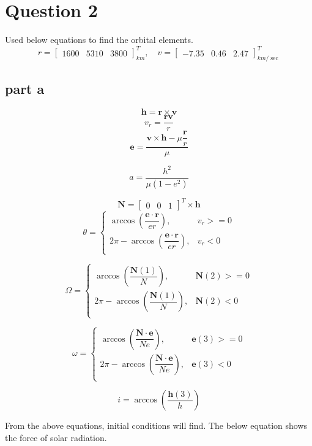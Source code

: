 \section{Question 2}
Used below equations to find the orbital elements.
$$
r = \begin{bmatrix}
    1600& 5310& 3800
\end{bmatrix}^{T}_{km}, \quad 
v = \begin{bmatrix}
    -7.35 & 0.46 & 2.47
\end{bmatrix}^{T}_{km/\sec}
$$
\subsection{part a}
$$
\boldsymbol h = \boldsymbol r \times \boldsymbol v 
$$
$$
v_r = \dfrac{\boldsymbol r \boldsymbol v}{r}
$$
$$
\boldsymbol e = \dfrac{\boldsymbol v \times \boldsymbol h -\mu \dfrac{\boldsymbol r}{r}}{\mu}
$$

$$
a = \dfrac{h^2}{\mu (1-e^2)}
$$

$$
\boldsymbol N = 
\begin{bmatrix}
    0 & 0 & 1
\end{bmatrix}^T \times \boldsymbol h
$$
$$
\theta = 
\begin{cases}
    \arccos\left(\dfrac{\boldsymbol e \cdot \boldsymbol r}{er}\right),& v_r >= 0\\
    2\pi-\arccos\left(\dfrac{\boldsymbol e \cdot \boldsymbol r}{er}\right),& v_r <  0\\
\end{cases}
$$

$$
\Omega = 
\begin{cases}
    \arccos\left(\dfrac{\boldsymbol N(1)}{N}\right),& \boldsymbol N(2) >= 0\\
    2\pi-\arccos\left(\dfrac{\boldsymbol N(1)}{N}\right) ,& \boldsymbol N(2) <0\\
\end{cases}
$$

$$
\omega = 
\begin{cases}
    \arccos\left(\dfrac{\boldsymbol N \cdot \boldsymbol e}{Ne}\right),& \boldsymbol e(3) >= 0\\
    2\pi-\arccos\left(\dfrac{\boldsymbol N \cdot \boldsymbol e}{Ne}\right) ,& \boldsymbol e(3) <0\\
\end{cases}
$$

$$
i = \arccos\left(\dfrac{\boldsymbol h(3)}{h}\right)
$$

From the above equations, initial conditions will find. The below equation shows the force of solar radiation.

